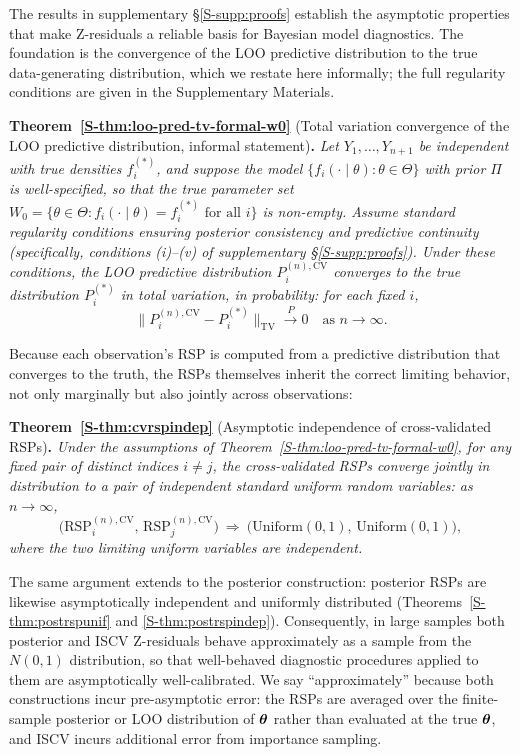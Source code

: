 The results in supplementary \S\ref{S-supp:proofs} establish the asymptotic
properties that make Z-residuals a reliable basis for Bayesian model
diagnostics. The foundation is the convergence of the LOO predictive
distribution to the true data-generating distribution, which we restate here
informally; the full regularity conditions are given in the Supplementary
Materials.

\medskip
\noindent\textbf{Theorem~\ref*{S-thm:loo-pred-tv-formal-w0}}
(Total variation convergence of the LOO predictive distribution, informal
statement)\textbf{.}
\emph{Let $Y_1,\dots,Y_{n+1}$ be independent with true densities
$f_i^{(*)}$, and suppose the model
$\{f_i(\cdot\mid\theta):\theta\in\Theta\}$ with prior $\Pi$ is
well-specified, so that the true parameter set
$W_0=\{\theta\in\Theta: f_i(\cdot\mid\theta)=f_i^{(*)} \text{ for all } i\}$
is non-empty. Assume standard regularity conditions ensuring posterior consistency and predictive continuity (specifically, conditions (i)--(v) of supplementary \S\ref{S-supp:proofs}). Under these conditions, the LOO predictive distribution $P_i^{(n),\mathrm{CV}}$ converges to the true distribution $P_i^{(*)}$ in total variation, in probability: for each fixed $i$,}
\begin{equation}
\big\|P_i^{(n),\mathrm{CV}}-P_i^{(*)}\big\|_{\mathrm{TV}}
\xrightarrow{P} 0 \quad \text{as } n\to\infty.
\end{equation}

\medskip
Because each observation's RSP is computed from a predictive distribution
that converges to the truth, the RSPs themselves inherit the correct
limiting behavior, not only marginally but also jointly across observations:

\medskip
\noindent\textbf{Theorem~\ref*{S-thm:cvrspindep}}
(Asymptotic independence of cross-validated RSPs)\textbf{.}
\emph{Under the assumptions of
Theorem~\ref*{S-thm:loo-pred-tv-formal-w0}, for any fixed pair of distinct
indices $i \neq j$, the cross-validated RSPs converge jointly in
distribution to a pair of independent standard uniform random variables:
as $n\to\infty$,}
\begin{equation}
\big(\mathrm{RSP}_i^{(n),\mathrm{CV}},\,
\mathrm{RSP}_j^{(n),\mathrm{CV}}\big)
\ \Rightarrow\
\big(\mathrm{Uniform}(0,1),\,\mathrm{Uniform}(0,1)\big),
\end{equation}
\emph{where the two limiting uniform variables are independent.}

The same argument extends to the posterior construction: posterior RSPs are
likewise asymptotically independent and uniformly distributed
(Theorems~\ref{S-thm:postrspunif} and \ref{S-thm:postrspindep}).
Consequently, in large samples both posterior and ISCV Z-residuals behave
approximately as a sample from the $N(0,1)$ distribution,
so that well-behaved diagnostic procedures applied to them are
asymptotically well-calibrated. We say ``approximately'' because
both constructions incur pre-asymptotic error: the RSPs are averaged over
the finite-sample posterior or LOO distribution of $\bm{\theta}$ rather than
evaluated at the true $\bm{\theta}$, and ISCV incurs additional error from
importance sampling.

